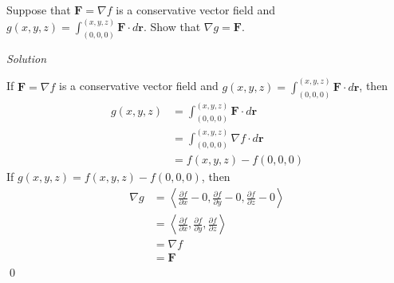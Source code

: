 \documentclass{article}
\newcommand{\lra}[1]{\left\langle #1 \right\rangle}
\renewcommand{\r}[0]{\mathbf{r}}
\newcommand{\F}[0]{\mathbf{F}}
\newcommand{\Solution}{\textit{Solution}}
\begin{document}
Suppose that $\F=\nabla f$ is a conservative vector field and $\displaystyle g(x,y,z)=\int_{(0,0,0)}^{(x,y,z)}\F\cdot d\r$. Show that $\nabla g=\F$.

\Solution

If $\F=\nabla f$ is a conservative vector field and $\displaystyle g(x,y,z)=\int_{(0,0,0)}^{(x,y,z)}\F\cdot d\r$, then
\begin{align*}
    g(x,y,z)&=\int_{(0,0,0)}^{(x,y,z)}\F\cdot d\r\\
    &=\int_{(0,0,0)}^{(x,y,z)} \nabla f \cdot d\r\\
    &=f(x,y,z)-f(0,0,0)
\end{align*}
If $g(x,y,z)=f(x,y,z)-f(0,0,0)$, then
\begin{align*}
    \nabla g &=\lra{\frac{\partial f}{\partial x}- 0, \frac{\partial f}{\partial y}- 0, \frac{\partial f}{\partial z}- 0}\tag{$f(0,0,0)$ is just some constant}\\
    &=\lra{\frac{\partial f}{\partial x}, \frac{\partial f}{\partial y}, \frac{\partial f}{\partial z}}\\
    &=\nabla f\\
    &=\F
\end{align*}
\qed
\end{document}
